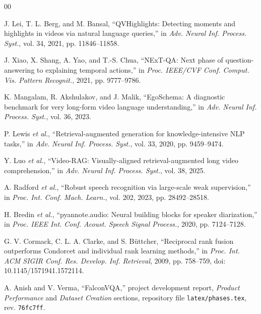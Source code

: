 \begin{thebibliography}{00}

J. Lei, T. L. Berg, and M. Bansal, ``QVHighlights: Detecting moments and highlights in videos via natural language queries,'' in \emph{Adv. Neural Inf. Process. Syst.}, vol. 34, 2021, pp. 11846--11858.

J. Xiao, X. Shang, A. Yao, and T.-S. Chua, ``NExT-QA: Next phase of question-answering to explaining temporal actions,'' in \emph{Proc. IEEE/CVF Conf. Comput. Vis. Pattern Recognit.}, 2021, pp. 9777--9786.

K. Mangalam, R. Akshulakov, and J. Malik, ``EgoSchema: A diagnostic benchmark for very long-form video language understanding,'' in \emph{Adv. Neural Inf. Process. Syst.}, vol. 36, 2023.

P. Lewis \emph{et al.}, ``Retrieval-augmented generation for knowledge-intensive NLP tasks,'' in \emph{Adv. Neural Inf. Process. Syst.}, vol. 33, 2020, pp. 9459--9474.

Y. Luo \emph{et al.}, ``Video-RAG: Visually-aligned retrieval-augmented long video comprehension,'' in \emph{Adv. Neural Inf. Process. Syst.}, vol. 38, 2025.

A. Radford \emph{et al.}, ``Robust speech recognition via large-scale weak supervision,'' in \emph{Proc. Int. Conf. Mach. Learn.}, vol. 202, 2023, pp. 28492--28518.

H. Bredin \emph{et al.}, ``pyannote.audio: Neural building blocks for speaker diarization,'' in \emph{Proc. IEEE Int. Conf. Acoust. Speech Signal Process.}, 2020, pp. 7124--7128.

G. V. Cormack, C. L. A. Clarke, and S. B\"uttcher, ``Reciprocal rank fusion outperforms Condorcet and individual rank learning methods,'' in \emph{Proc. Int. ACM SIGIR Conf. Res. Develop. Inf. Retrieval}, 2009, pp. 758--759, doi: 10.1145/1571941.1572114.

A. Anish and V. Verma, ``FalconVQA,'' project development report, \emph{Product Performance} and \emph{Dataset Creation} sections, repository file \texttt{latex/phases.tex}, rev. \texttt{76fc7ff}.

\end{thebibliography}

